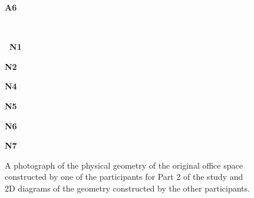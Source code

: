 \begin{figure}[t]
\begin{center}
\begin{minipage}{0.95in}{\bf A6}\end{minipage}
\vspace{0.78in}
\\
\begin{minipage}{1.92in}{\bf ~N1}\end{minipage}
\begin{minipage}{0.95in}{\bf N2}\end{minipage}
\begin{minipage}{0.95in}{\bf N4}\end{minipage}
\begin{minipage}{0.95in}{\bf N5}\end{minipage}
\begin{minipage}{0.95in}{\bf N6}\end{minipage}
\begin{minipage}{0.95in}{\bf N7}\end{minipage}\vspace{-0.08in}%
\end{center}
  \caption{
  \label{figure:original_designs}
A photograph of the physical geometry of the original office space
constructed by one of the participants for Part 2 of the study and 2D
diagrams of the geometry constructed by the other participants. 
}
\end{figure}

